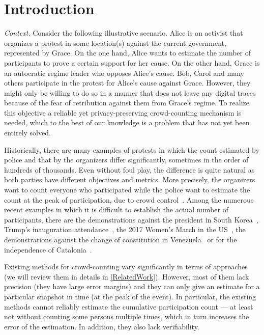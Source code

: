 \section{Introduction}%
\label{Introduction}

\emph{Context.} Consider the following illustrative scenario.
Alice is an activist that organizes a protest in some location(s) against the 
current government, represented by Grace.
On the one hand, Alice wants to estimate the number of participants to prove a certain support for her cause.
On the other hand, Grace is an autocratic regime leader who opposes Alice's cause.
Bob, Carol and many others participate in the protest for Alice's cause against Grace.
However, they might only be willing to do so in a manner that does not leave any digital traces because of the fear of retribution against them from Grace's regime. 
To realize this objective a reliable yet privacy-preserving crowd-counting mechanism is needed, which to the best of our knowledge is a problem that has not yet been entirely solved.

Historically, there are many examples of protests in which the count estimated by police and that by the organizers 
differ significantly, sometimes in the order of hundreds of thousands.
Even without foul play, the difference is quite natural as both parties have different objectives and metrics.
More precisely, the organizers want to count everyone who participated while the police want to estimate the count at the peak of participation, due to crowd control~\cite{2016DemonstrationsInSeoul}.
Among the numerous recent examples in which it is difficult to establish the actual number of participants, there are the demonstrations against the president in South Korea~\cite{2016DemonstrationsInSeoul}, Trump's inauguration attendance~\cite{HowWillWeKnowTrumpInauguralCrowdSize}, the 2017 Women's March in the US~\cite{2017WomensMarchesInUS}, the demonstrations against the change of constitution in Venezuela~\cite{AlJazeeraOnVenezuela2017} or for the independence of Catalonia~\cite{CataloniaDemonstrations}.

Existing methods for crowd-counting vary significantly in terms of approaches (we will review them in details in \cref{RelatedWork}).
However, most of them lack precision (\ie they have large error margins) and they can only give an estimate for a particular snapshot in time (\eg at the peak of the event). 
In particular, the existing methods cannot reliably estimate the cumulative participation count --- at least not without counting some persons multiple times, which in turn increases the error of the estimation.
In addition, they also lack verifiability. 

